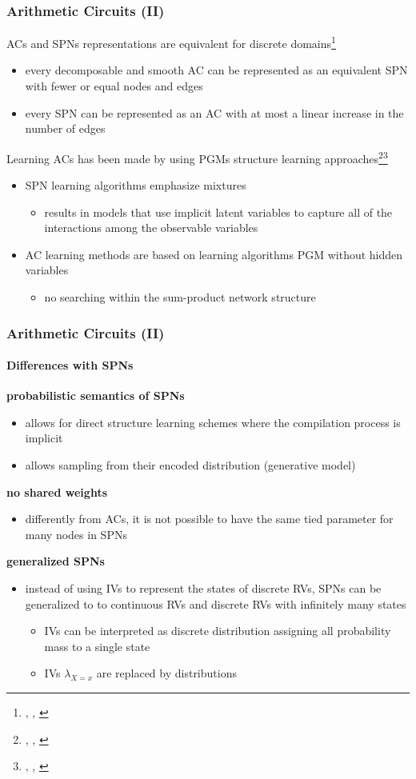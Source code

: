 \documentclass[10pt, t, xcolor={usenames,dvipsnames,svgnames}, compress]{beamer}
\newcommand{\customcite}[1]{\footnote{\scriptsize \citeauthor{#1}, \citetitle{#1}, \citeyear{#1}}}
\begin{document}
\begin{frame}
  \frametitle{Arithmetic Circuits (II)}

ACs and SPNs representations are equivalent for discrete
domains\customcite{Rooshenas2014}
\begin{itemize}
\item every decomposable and smooth AC can be represented as an equivalent SPN
with fewer or equal nodes and edges
\item every  SPN  can  be represented as an AC with at most a linear increase in
  the number of edges
\end{itemize}
Learning ACs has been made by using PGMs structure learning
approaches\customcite{Lowd2012}\customcite{Lowd2013} 
\begin{itemize}
\item SPN learning algorithms emphasize mixtures
\begin{itemize}
\item results in models that use implicit latent variables to
capture all of the interactions among the observable variables
\end{itemize}
\item AC learning methods are based on learning  algorithms PGM  without  hidden
  variables 
\begin{itemize}
\item no searching within the sum-product network structure
\end{itemize}
\end{itemize}
\end{frame}

\begin{frame}
  \frametitle{Arithmetic Circuits (II)}
  \framesubtitle{Differences with SPNs}

{\color{blue}\textbf{probabilistic semantics of SPNs}}
  \begin{itemize}
  \item allows for direct structure learning schemes where the compilation
    process is implicit
  \item allows sampling from their encoded distribution (generative model)
  \end{itemize}
{\color{blue}\textbf{no shared weights}}
\begin{itemize}
\item differently from ACs, it is not possible to have the same tied parameter
  for many nodes in SPNs
\end{itemize}
{\color{blue}\textbf{generalized SPNs}}
\begin{itemize}
\item instead of using IVs to represent the states of discrete RVs, SPNs can be
  generalized to to continuous RVs and discrete RVs with infinitely many states
\begin{itemize}
\item IVs can be interpreted as discrete distribution assigning all probability
  mass to a single state
\item IVs $\lambda_{X=x}$ are replaced by distributions
\end{itemize}
\end{itemize}
\end{frame}
\end{document}
